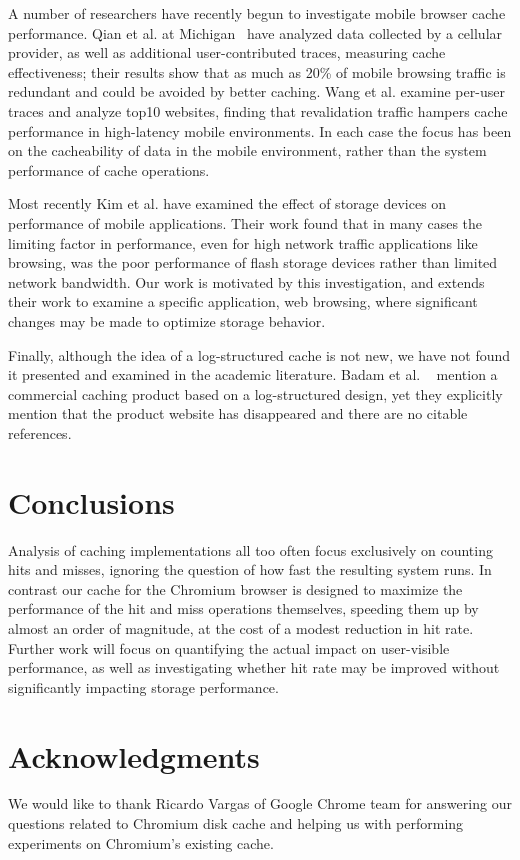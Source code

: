 \documentclass[letterpaper,twocolumn,10pt]{article}
\begin{document}
A number of researchers have recently begun to investigate mobile browser cache
performance. Qian et al. at Michigan~\cite{qian_web_2012} have analyzed data
collected by a cellular provider, as well as additional user-contributed traces,
measuring cache effectiveness; their results show that as much as 20\% of mobile
browsing traffic is redundant and could be avoided by better caching. Wang et
al. \cite{wang_how_2011} examine per-user traces and analyze top10 websites,
finding that revalidation traffic hampers cache performance in high-latency
mobile environments. In each case the focus has been on the cacheability of data
in the mobile environment, rather than the system performance of cache
operations.

Most recently Kim et al. \cite{kim12} have examined the effect of storage
devices on performance of mobile applications. Their work found that in many
cases the limiting factor in performance, even for high network traffic
applications like browsing, was the poor performance of flash storage devices
rather than limited network bandwidth. Our work is motivated by this
investigation, and extends their work to examine a specific application, web
browsing, where significant changes may be made to optimize storage behavior.

Finally, although the idea of a log-structured cache is not new, we have not
found it presented and examined in the academic literature.  Badam et
al. ~\cite{hashcache} mention a commercial caching product based on a
log-structured design, yet they explicitly mention that the product website has
disappeared and there are no citable references.

\section{Conclusions}

Analysis of caching implementations all too often focus exclusively on
counting hits and misses, ignoring the question of how fast the
resulting system runs. In contrast our cache for the Chromium browser
is designed to maximize the performance of the hit and miss operations
themselves, speeding them up by almost an order of magnitude, at the
cost of a modest reduction in hit rate. Further work will focus on
quantifying the actual impact on user-visible performance, as well as
investigating whether hit rate may be improved without significantly
impacting storage performance.

\section*{Acknowledgments}

We would like to thank Ricardo Vargas of Google Chrome team for answering our
questions related to Chromium disk cache and helping us with performing
experiments on Chromium's existing cache.


\end{document}
